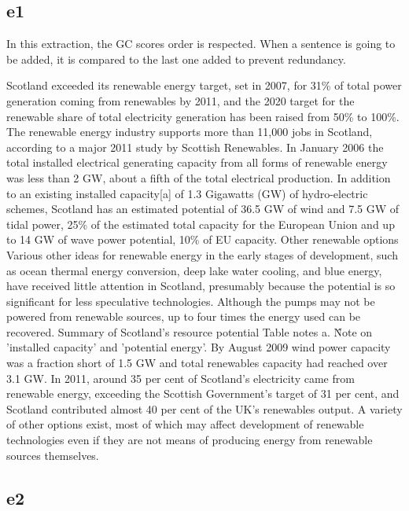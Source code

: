 \subsection{e1}

In this extraction, the GC scores order is respected.
When a sentence is going to be added, it is compared to the last one added to prevent redundancy.

\begin{tcolorbox}\footnotesize
	Scotland exceeded its renewable energy target, set in 2007, for 31\% of total power generation coming from renewables by 2011, and the 2020 target for the renewable share of total electricity generation has been raised from 50\% to 100\%.
	The renewable energy industry supports more than 11,000 jobs in Scotland, according to a major 2011 study by Scottish Renewables.
	In January 2006 the total installed electrical generating capacity from all forms of renewable energy was less than 2 GW, about a fifth of the total electrical production.
	In addition to an existing installed capacity[a] of 1.3 Gigawatts (GW) of hydro-electric schemes, Scotland has an estimated potential of 36.5 GW of wind and 7.5 GW of tidal power, 25\% of the estimated total capacity for the European Union and up to 14 GW of wave power potential, 10\% of EU capacity.
	Other renewable options Various other ideas for renewable energy in the early stages of development, such as ocean thermal energy conversion, deep lake water cooling, and blue energy, have received little attention in Scotland, presumably because the potential is so significant for less speculative technologies.
	Although the pumps may not be powered from renewable sources, up to four times the energy used can be recovered.
	Summary of Scotland's resource potential Table notes a. \^ Note on 'installed capacity' and 'potential energy'.
	By August 2009 wind power capacity was a fraction short of 1.5 GW and total renewables capacity had reached over 3.1 GW.
	In 2011, around 35 per cent of Scotland’s electricity came from renewable energy, exceeding the Scottish Government’s target of 31 per cent, and Scotland contributed almost 40 per cent of the UK’s renewables output.
	A variety of other options exist, most of which may affect development of renewable technologies even if they are not means of producing energy from renewable sources themselves.
\end{tcolorbox}

\subsection{e2}

